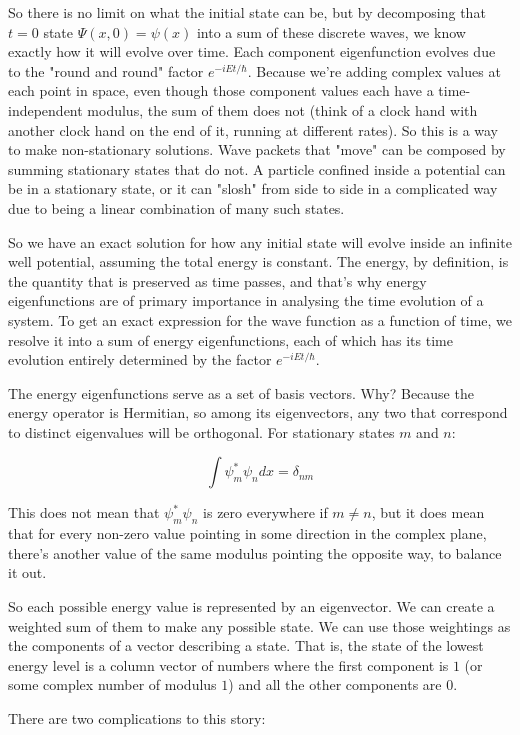 So there is no limit on what the initial state can be, but by decomposing that $t = 0$ state $\Psi(x, 0) = \psi(x)$ into a sum of these discrete waves, we know exactly how it will evolve over time. Each component eigenfunction evolves due to the "round and round" factor $e^{-iEt/\hbar}$. Because we're adding complex values at each point in space, even though those component values each have a time-independent modulus, the sum of them does not (think of a clock hand with another clock hand on the end of it, running at different rates). So this is a way to make non-stationary solutions. Wave packets that "move" can be composed by summing stationary states that do not. A particle confined inside a potential can be in a stationary state, or it can "slosh" from side to side in a complicated way due to being a linear combination of many such states.

So we have an exact solution for how any initial state will evolve inside an infinite well potential, assuming the total energy is constant. The energy, by definition, is the quantity that is preserved as time passes, and that's why energy eigenfunctions are of primary importance in analysing the time evolution of a system. To get an exact expression for the wave function as a function of time, we resolve it into a sum of energy eigenfunctions, each of which has its time evolution entirely determined by the factor $e^{-iEt/\hbar}$.

The energy eigenfunctions serve as a set of basis vectors. Why? Because the energy operator is Hermitian, so among its eigenvectors, any two that correspond to distinct eigenvalues will be orthogonal. For stationary states $m$ and $n$:

$$
\int
\psi_m^* \psi_n dx = \delta_{nm}
$$

This does not mean that $\psi_m^* \psi_n$ is zero everywhere if $m \ne n$, but it does mean that for every non-zero value pointing in some direction in the complex plane, there's another value of the same modulus pointing the opposite way, to balance it out.

So each possible energy value is represented by an eigenvector. We can create a weighted sum of them to make any possible state. We can use those weightings as the components of a vector describing a state. That is, the state of the lowest energy level is a column vector of numbers where the first component is $1$ (or some complex number of modulus $1$) and all the other components are $0$.

There are two complications to this story:

